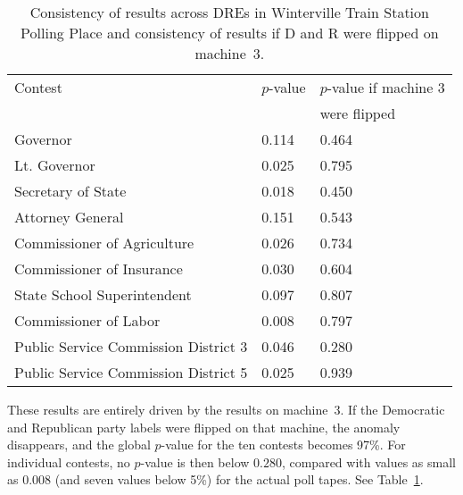 \documentclass[runningheads]{llncs}
\begin{document}
\begin{table}[ht]
\caption{Consistency of results across DREs in Winterville Train Station Polling Place and consistency of results if D and R were flipped on machine~3.}
\begin{center}
\begin{tabular}{|l|l|l|}
Contest 						& $p$-value  & $p$-value if machine 3 \\
             						& 		    & were flipped\\
 \hline
Governor						& 0.114 & 0.464 \\
Lt. Governor 					& 0.025 & 0.795 \\
Secretary of State 				& 0.018 & 0.450 \\
Attorney General				& 0.151 & 0.543 \\
Commissioner of Agriculture		& 0.026 & 0.734 \\
Commissioner of Insurance		& 0.030 & 0.604 \\
State School Superintendent		& 0.097 & 0.807 \\
Commissioner of Labor			& 0.008 & 0.797 \\
Public Service Commission District 3 & 0.046 & 0.280 \\
Public Service Commission District 5 & 0.025 & 0.939
\end{tabular}
\end{center}
\label{tab:winterville}
\end{table}%

These results are entirely driven by the results on machine~3.
If the Democratic and Republican party labels were flipped on that machine, the anomaly disappears,
and the global $p$-value for the ten contests becomes 97\%.
For individual contests, no $p$-value is then below $0.280$,
compared with values as small as $0.008$ (and seven values below 5\%) for the actual poll tapes.
See Table~\ref{tab:winterville}.  
%
\end{document}

